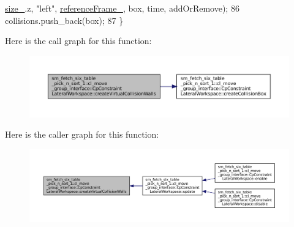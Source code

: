 \begin{DoxyCode}
      \hyperlink{classsm__fetch__six__table__pick__n__sort__1_1_1cl__move__group__interface_1_1CpConstraintLateralWorkspace_a31750f9209a83e0abab106676f13b577}{size\_}.z, \textcolor{stringliteral}{"left"}, \hyperlink{classsm__fetch__six__table__pick__n__sort__1_1_1cl__move__group__interface_1_1CpConstraintLateralWorkspace_aa736818af32861dede32b3d3165bb72c}{referenceFrame\_}, box, time, addOrRemove);
86             collisions.push\_back(box);
87         \}
\end{DoxyCode}
Here is the call graph for this function\+:
\nopagebreak
\begin{figure}[H]
\begin{center}
\leavevmode
\includegraphics[width=350pt]{classsm__fetch__six__table__pick__n__sort__1_1_1cl__move__group__interface_1_1CpConstraintLateralWorkspace_a32b7f02170ebee9e56b55cb69de22ba6_cgraph}
\end{center}
\end{figure}
Here is the caller graph for this function\+:
\nopagebreak
\begin{figure}[H]
\begin{center}
\leavevmode
\includegraphics[width=350pt]{classsm__fetch__six__table__pick__n__sort__1_1_1cl__move__group__interface_1_1CpConstraintLateralWorkspace_a32b7f02170ebee9e56b55cb69de22ba6_icgraph}
\end{center}
\end{figure}
\mbox{\label{classsm__fetch__six__table__pick__n__sort__1_1_1cl__move__group__interface_1_1CpConstraintLateralWorkspace_abe866d3ab465ccf96eee650be8f8c557}} 
